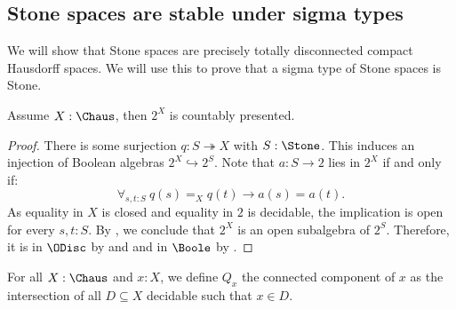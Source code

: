\subsection{Stone spaces are stable under sigma types}
We will show that Stone spaces are precisely totally disconnected compact Hausdorff spaces. 
We will use this to prove that a sigma type of Stone spaces is Stone.

\begin{lemma}\label{AlgebraCompactHausdorffCountablyPresented}
Assume $X:\Chaus$, then $2^X$ is countably presented.
\end{lemma}

\begin{proof}
  There is some surjection $q:S\twoheadrightarrow X$ with $S:\Stone$. 
%
  This induces an injection of Boolean algebras $2^X \hookrightarrow 2^S$.
  Note that $a:S\to 2$ lies in $2^X$ if and only if: %
  \[\forall_{s,t:S}\ q(s) =_X q(t) \to a(s)=a(t).\]
  As equality in $X$ is closed and equality in $2$ is decidable, the implication is open for every $s,t:S$. 
  By , we conclude that
  $2^X$ is an open subalgebra of $2^S$. 
  Therefore, it is in $\ODisc$ by
   and  
  and in $\Boole$ by .
%
%
%
\end{proof}
\begin{definition}
For all $X:\Chaus$ and $x:X$,
  we define $Q_x$ the connected component of $x$
  as the intersection of all $D\subseteq X$ decidable such that $x\in D$. 
\end{definition}

